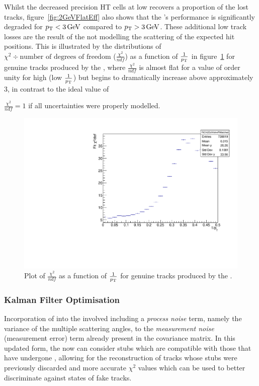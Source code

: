Whilst the decreased precision HT cells at low \pT recovers a proportion of the lost tracks, figure~\ref{fig:2GeVFlatEff}  also shows that the \KF's performance is significantly degraded for $p_{\mathrm{T}} < 3 \,\text{Ge\hspace{-.08em}V}$ compared to $p_{\mathrm{T}} > 3 \,\text{Ge\hspace{-.08em}V}$.
These additional low \pT track losses are the result of the \KF not modelling the scattering of the expected hit positions.
This is illustrated by the distributions of $\chi^{2} \div \text{number of degrees of freedom}$ ($\frac{\chi^{2}}{ndf}$) as a function of $\frac{1}{p_{\mathrm{T}}}$ in figure~\ref{fig:2GeVFlatChi2Ndf} for genuine tracks produced by the \KF, where $\frac{\chi^{2}}{ndf}$ is almost flat for a value of order unity for high \pT (low $\frac{1}{p_{\mathrm{T}}}$) but begins to dramatically increase above approximately 3\GeV, in contrast to the ideal value of {$\frac{\chi^{2}}{ndf} = 1$ if all uncertainties were properly modelled.

\begin{figure}[tbp]
\centering
\includegraphics[width=\textwidth]{figs/tk-upgrade/results-lowPtTracking/kfChi2NdfVsInvPtFlatGeometry_5000.pdf}
\caption{Plot of $\frac{\chi^{2}}{ndf}$ as a function of $\frac{1}{p_{\mathrm{T}}}$ for genuine tracks produced by the \KF.}
\label{fig:2GeVFlatChi2Ndf}
\end{figure}

\subsubsection{Kalman Filter Optimisation}
Incorporation of \MS into the \KF involved including a \emph{process noise} term, namely the variance of the multiple scattering angles, to the \emph{measurement noise} (\ie measurement error) term already present in the \KF covariance matrix.
In this updated form, the \KF now can consider stubs which are compatible with those that have undergone \MS, allowing for the reconstruction of tracks whose stubs were previously discarded and more accurate $\chi^{2}$ values which can be used to better discriminate against states of fake tracks.

}
